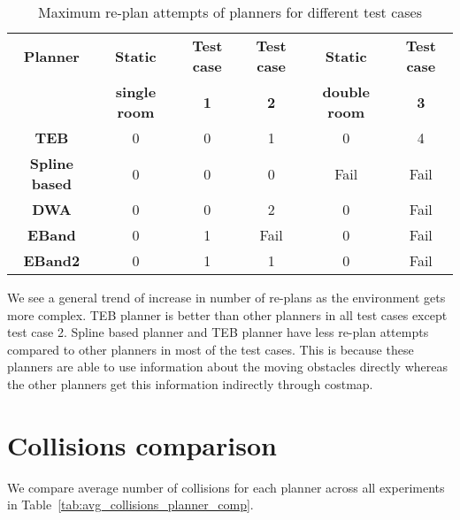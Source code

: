 \begin{table}[H]
    \centering
    \begin{tabular}{cccccc}\toprule
        \textbf{Planner} & \textbf{Static} & \textbf{Test case} & \textbf{Test case} & \textbf{Static} & \textbf{Test case} \\
                         & \textbf{single room} & \textbf{1} & \textbf{2} & \textbf{double room}       & \textbf{3} \\\toprule
        \textbf{TEB         } & 0 & 0 & 1 & 0 & 4 \\
        \textbf{Spline based} & 0 & 0 & 0 & Fail & Fail \\
        \textbf{DWA         } & 0 & 0 & 2 & 0 & Fail \\
        \textbf{EBand       } & 0 & 1 & Fail & 0 & Fail \\
        \textbf{EBand2      } & 0 & 1 & 1 & 0 & Fail \\
        \bottomrule
    \end{tabular}
    \caption{Maximum re-plan attempts of planners for different test cases}\label{tab:max_re-plan_planner_comp}
\end{table}

We see a general trend of increase in number of re-plans as the environment gets more complex. TEB
planner is better than other planners in all test cases except test case 2. Spline based planner and
TEB planner have less re-plan attempts compared to other planners in most of the test cases. This is 
because these planners are able to use information about the moving obstacles directly whereas the 
other planners get this information indirectly through costmap. 

\section{Collisions comparison}%
\label{sec:collisions_comparison}

We compare average number of collisions for each planner across all experiments in Table~\ref{tab:avg_collisions_planner_comp}.

